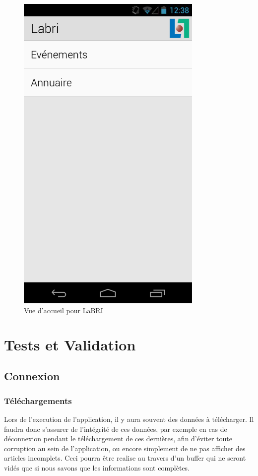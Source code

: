 \documentclass [pdftex,12pt] {report}
\begin{document}
\begin{figure}
  \centering
  \begin{minipage}[t]{8cm}
    \centering
    \includegraphics[width=0.8\textwidth]{resources/ui_preview/09}
    \caption{Vue d'accueil pour LaBRI}
    \label{fig:09}
  \end{minipage}
\end{figure}

\chapter{Tests et Validation}
  \section{Connexion}
    \subsection{Téléchargements}
      Lors de l'execution de l'application, il y aura souvent des données à télécharger. Il faudra donc s'assurer de l'intégrité de ces données, par exemple en cas de déconnexion pendant le téléchargement de ces dernières, afin d'éviter toute corruption au sein de l'application, ou encore simplement de ne pas afficher des articles incomplets. Ceci pourra être realise au travers d'un buffer qui ne seront vidés que si nous savons que les informations sont complètes.
\end{document}

